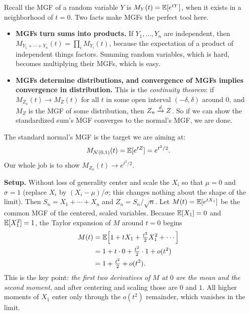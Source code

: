 Recall the MGF of a random variable $Y$ is $M_Y(t) = \operatorname{\mathbb{E}}[e^{tY}]$, when it exists in a
neighborhood of $t=0$. Two facts make MGFs the perfect tool here.

\begin{itemize}
\item \textbf{MGFs turn sums into products.} If $Y_1, \dots, Y_n$ are independent, then
$M_{Y_1 + \cdots + Y_n}(t) = \prod_i M_{Y_i}(t)$, because the expectation of a product
of independent things factors. Summing random variables, which is hard, becomes
multiplying their MGFs, which is easy.
\item \textbf{MGFs determine distributions, and convergence of MGFs implies
convergence in distribution.} This is the \emph{continuity theorem}: if
$M_{Z_n}(t) \to M_Z(t)$ for all $t$ in some open interval $(-\delta, \delta)$ around $0$, and $M_Z$ is the MGF of some distribution,
then $Z_n \xrightarrow{d} Z$. So if we can show the standardized sum's MGF converges to the normal's
MGF, we are done.
\end{itemize}

The standard normal's MGF is the target we are aiming at:
\[
  M_{\mathcal{N}(0,1)}(t) = \operatorname{\mathbb{E}}[e^{tZ}] = e^{t^2/2}.
\]
Our whole job is to show $M_{Z_n}(t) \to e^{t^2/2}$.

\textbf{Setup.} Without loss of generality center and scale the $X_i$ so that $\mu = 0$
and $\sigma = 1$ (replace $X_i$ by $(X_i - \mu)/\sigma$; this changes nothing about
the shape of the limit). Then $S_n = X_1 + \cdots + X_n$ and
$Z_n = S_n / \sqrt{n}$. Let $M(t) = \operatorname{\mathbb{E}}[e^{tX_1}]$ be the common MGF of the centered,
scaled variables. Because $\operatorname{\mathbb{E}}[X_1] = 0$ and $\operatorname{\mathbb{E}}[X_1^2] = 1$, the Taylor expansion of $M$
around $t=0$ begins
\begin{align*}
  M(t) &= \operatorname{\mathbb{E}}\!\left[ 1 + tX_1 + \tfrac{t^2}{2} X_1^2 + \cdots \right] \\
       &= 1 + t\cdot 0 + \tfrac{t^2}{2}\cdot 1 + o(t^2) \\
       &= 1 + \tfrac{t^2}{2} + o(t^2).
\end{align*}
This is the key point: \emph{the first two derivatives of $M$ at $0$ are
the mean and the second moment}, and after centering and scaling those are $0$
and $1$. All higher moments of $X_1$ enter only through the $o(t^2)$ remainder,
which vanishes in the limit.

